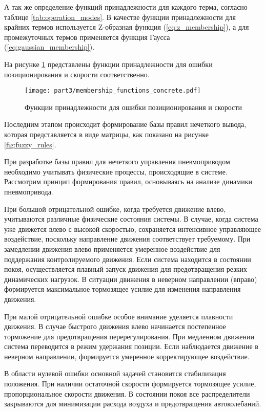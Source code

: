 А так же определение функций принадлежности для каждого терма, согласно таблице
\ref{tab:operation_modes}. В качестве функции принадлежности для крайних термов используется Z-образная функция (\ref{eq:z_membership}),
а для промежуточных термов применяется функция Гаусса (\ref{eq:gaussian_membership}).

На рисунке \ref{fig:membership_functions_concrete} представлены функции принадлежности
для ошибки позиционирования и скорости соответственно.

\begin{figure}[ht]
	\centering
	\texttt{[image: part3/membership\_functions\_concrete.pdf]}
	\caption{Функции принадлежности для ошибки позиционирования и скорости}
	\label{fig:membership_functions_concrete}
\end{figure}

Последним этапом происходит формирование базы правил нечеткого вывода, которая представляется
в виде матрицы, как показано на рисунке \ref{fig:fuzzy_rules}.

При разработке базы правил для нечеткого управления пневмоприводом
необходимо учитывать физические процессы, происходящие в системе.
Рассмотрим принцип формирования правил, основываясь на анализе
динамики пневмопривода.

При большой отрицательной ошибке, когда требуется движение влево,
учитываются различные физические состояния системы. В случае,
когда система уже движется влево с высокой скоростью, сохраняется
интенсивное управляющее воздействие, поскольку направление движения
соответствует требуемому. При замедлении движения влево применяется
умеренное воздействие для поддержания контролируемого движения.
Если система находится в состоянии покоя, осуществляется плавный
запуск движения для предотвращения резких динамических нагрузок.
В ситуации движения в неверном направлении (вправо) формируется
максимальное тормозящее усилие для изменения направления движения.

При малой отрицательной ошибке особое внимание уделяется
плавности движения. В случае быстрого движения влево начинается
постепенное торможение для предотвращения перерегулирования.
При медленном движении система переводится в режим удержания
позиции. Если наблюдается движение в неверном направлении,
формируется умеренное корректирующее воздействие.

В области нулевой ошибки основной задачей становится стабилизация
положения. При наличии остаточной скорости формируется тормозящее
усилие, пропорциональное скорости движения. В состоянии покоя все
распределители закрываются для минимизации расхода воздуха и
предотвращения автоколебаний.


